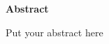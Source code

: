 \begin{center}
\begin{huge}
\bfseries{Abstract}
\end{huge}
\end{center}
\noindent Put your abstract here
\pagebreak

